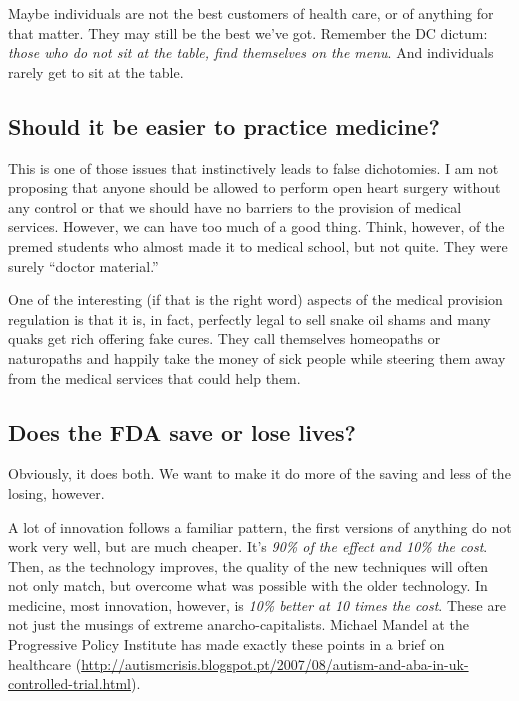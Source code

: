 Maybe individuals are not the best customers of health care, or of anything for
that matter. They may still be the best we've got. Remember the DC dictum:
\emph{those who do not sit at the table, find themselves on the menu}. And
individuals rarely get to sit at the table.

\subsection{Should it be easier to practice medicine?}

This is one of those issues that instinctively leads to false dichotomies. I am
not proposing that anyone should be allowed to perform open heart surgery
without any control or that we should have no barriers to the provision of
medical services. However, we can have too much of a good thing. Think,
however, of the premed students who almost made it to medical school, but not
quite.  They were surely ``doctor material.''

One of the interesting (if that is the right word) aspects of the medical
provision regulation is that it is, in fact, perfectly legal to sell snake oil
shams and many quaks get rich offering fake cures. They call themselves
homeopaths or naturopaths and happily take the money of sick people while
steering them away from the medical services that could help them.

\subsection{Does the FDA save or lose lives?}

Obviously, it does both. We want to make it do more of the saving and less of
the losing, however.

A lot of innovation follows a familiar pattern, the first versions of anything
do not work very well, but are much cheaper. It's \emph{90\% of the effect and
10\% the cost}. Then, as the technology improves, the quality of the new
techniques will often not only match, but overcome what was possible with the
older technology. In medicine, most innovation, however, is \emph{10\% better
at 10 times the cost}. These are not just the musings of extreme
anarcho-capitalists. Michael Mandel at the Progressive Policy Institute has
made exactly these points in a brief on healthcare
(\url{http://autismcrisis.blogspot.pt/2007/08/autism-and-aba-in-uk-controlled-trial.html}).

